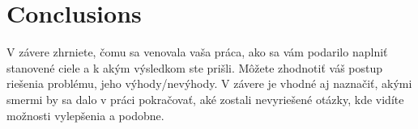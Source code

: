 \chapter{Conclusions}

V závere zhrniete, čomu sa venovala vaša práca, ako sa vám podarilo naplniť stanovené ciele a k akým výsledkom ste prišli. Môžete zhodnotiť váš postup riešenia problému, jeho výhody/nevýhody. V závere je vhodné aj naznačiť, akými smermi by sa dalo v práci pokračovať, aké zostali nevyriešené otázky, kde vidíte možnosti vylepšenia a podobne.
